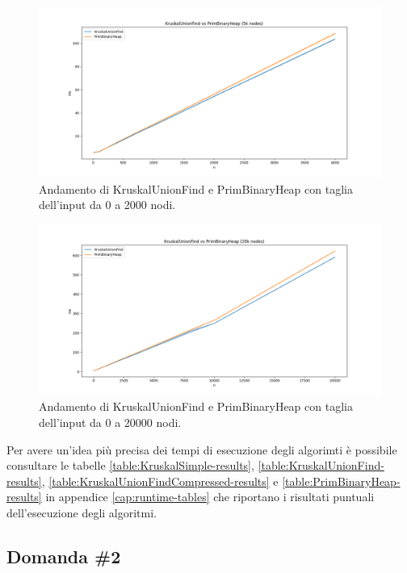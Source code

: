 \begin{figure}[H]
    \centering
    \includegraphics[width=1.0\textwidth]{./images/KruskalUnionFind_vs_PrimBinaryHeap_(5k_nodes).png}
	\caption{Andamento di KruskalUnionFind e PrimBinaryHeap con taglia dell'input da 0 a 2000 nodi.}
    \label{fig:TheTwoComparison2k}
\end{figure}

\begin{figure}[H]
    \centering
    \includegraphics[width=1.0\textwidth]{./images/KruskalUnionFind_vs_PrimBinaryHeap_(20k_nodes).png}
    \caption{Andamento di KruskalUnionFind e PrimBinaryHeap con taglia dell'input da 0 a 20000 nodi.}
    \label{fig:TheTwoComparison5k}
\end{figure}

\noindent Per avere un'idea più precisa dei tempi di esecuzione degli 
algorimti è possibile consultare le tabelle \ref{table:KruskalSimple-results},
 \ref{table:KruskalUnionFind-results}, \ref{table:KruskalUnionFindCompressed-results} 
 e \ref{table:PrimBinaryHeap-results} in appendice \ref{cap:runtime-tables} che riportano i risultati puntuali 
 dell'esecuzione degli algoritmi.

\subsection{Domanda \#2}

